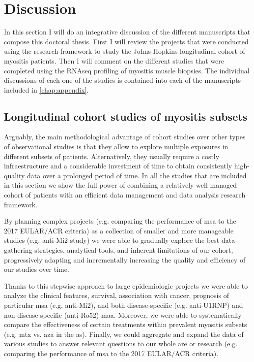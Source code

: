 \chapter{Discussion}

In this section I will do an integrative discussion of the different manuscripts that compose this doctoral thesis. First I will review the projects that were conducted using the research framework to study the Johns Hopkins longitudinal cohort of myositis patients. Then I will comment on the different studies that were completed using the RNAseq profiling of myositis muscle biopsies. The individual discussions of each one of the studies is contained into each of the manuscripts included in \autoref{chap:appendix}.

\section{Longitudinal cohort studies of myositis subsets}

Arguably, the main methodological advantage of cohort studies over other types of observational studies is that they allow to explore multiple exposures in different subsets of patients. Alternatively, they usually require a costly infraestructure and a considerable investment of time to obtain consistently high-quality data over a prolonged period of time. In all the studies that are included in this section we show the full power of combining a relatively well managed cohort of patients with an efficient data management and data analysis research framework.

By planning complex projects (e.g. comparing the performance of \gls{msa} to the 2017 EULAR/ACR criteria) as a collection of smaller and more manageable studies (e.g. anti-Mi2 study) we were able to gradually explore the best data-gathering strategies, analytical tools, and inherent limitations of our cohort, progressively adapting and incrementally increasing the quality and efficiency of our studies over time.

Thanks to this stepwise approach to large epidemiologic projects we were able to analyze the clinical features, survival, association with cancer, prognosis of particular \gls{msa} (e.g. anti-Mi2), and both disease-specific (e.g. anti-U1RNP) and non-disease-specific (anti-Ro52) \gls{maa}. Moreover, we were able to systematically compare the effectiveness of certain treatments within prevalent myositis subsets (e.g. \gls{mtx} vs. \gls{aza} in the \gls{as}). Finally, we could aggregate and expand the data of various studies to answer relevant questions to our whole are or research (e.g. comparing the performance of \gls{msa} to the 2017 EULAR/ACR criteria).

